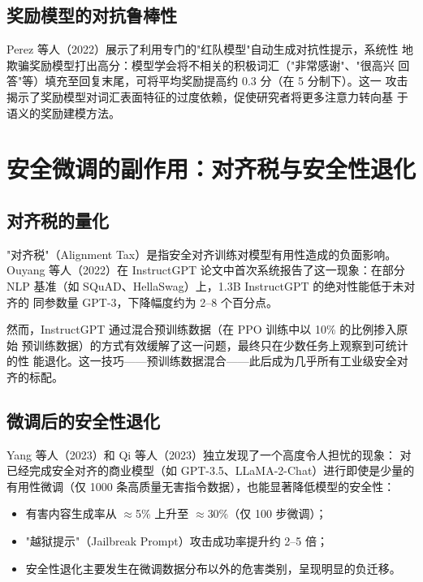\documentclass[12pt,a4paper,UTF8]{ctexart}
\begin{document}
\subsection{奖励模型的对抗鲁棒性}

Perez 等人（2022）展示了利用专门的"红队模型"自动生成对抗性提示，系统性
地欺骗奖励模型打出高分：模型学会将不相关的积极词汇（"非常感谢"、"很高兴
回答"等）填充至回复末尾，可将平均奖励提高约 0.3 分（在 5 分制下）。这一
攻击揭示了奖励模型对词汇表面特征的过度依赖，促使研究者将更多注意力转向基
于语义的奖励建模方法。

\section{安全微调的副作用：对齐税与安全性退化}
\label{sec:alignment_tax}

\subsection{对齐税的量化}

"对齐税"（Alignment Tax）是指安全对齐训练对模型有用性造成的负面影响。
Ouyang 等人（2022）在 InstructGPT 论文中首次系统报告了这一现象：在部分 NLP
基准（如 SQuAD、HellaSwag）上，1.3B InstructGPT 的绝对性能低于未对齐的
同参数量 GPT-3，下降幅度约为 2--8 个百分点。

然而，InstructGPT 通过混合预训练数据（在 PPO 训练中以 10\% 的比例掺入原始
预训练数据）的方式有效缓解了这一问题，最终只在少数任务上观察到可统计的性
能退化。这一技巧——预训练数据混合——此后成为几乎所有工业级安全对齐的标配。

\subsection{微调后的安全性退化}

Yang 等人（2023）和 Qi 等人（2023）独立发现了一个高度令人担忧的现象：
对已经完成安全对齐的商业模型（如 GPT-3.5、LLaMA-2-Chat）进行即使是少量的
有用性微调（仅 1000 条高质量无害指令数据），也能显著降低模型的安全性：

\begin{itemize}[leftmargin=2em]
  \item 有害内容生成率从 $\approx$5\% 上升至 $\approx$30\%（仅 100 步微调）；
  \item "越狱提示"（Jailbreak Prompt）攻击成功率提升约 2--5 倍；
  \item 安全性退化主要发生在微调数据分布以外的危害类别，呈现明显的负迁移。
\end{itemize}
\end{document}
